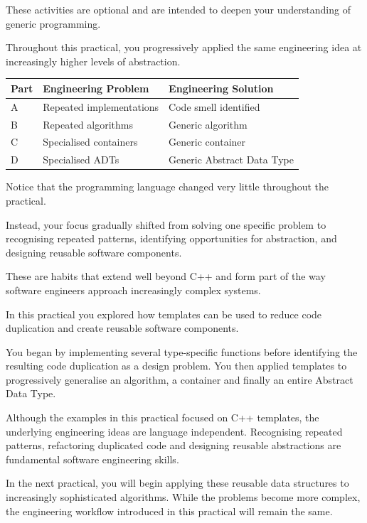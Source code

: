 \documentclass{csc2059practical}
\begin{document}
These activities are optional and are intended to deepen your understanding of generic programming.


Throughout this practical, you progressively applied the same engineering idea at increasingly higher levels of abstraction.

\begin{center}
\begin{tabular}{lll}
\toprule
\textbf{Part} & \textbf{Engineering Problem} & \textbf{Engineering Solution} \\
\midrule
A & Repeated implementations & Code smell identified \\
B & Repeated algorithms & Generic algorithm \\
C & Specialised containers & Generic container \\
D & Specialised ADTs & Generic Abstract Data Type \\
\bottomrule
\end{tabular}
\end{center}

Notice that the programming language changed very little throughout the practical.

Instead, your focus gradually shifted from solving one specific problem to recognising repeated patterns, identifying opportunities for abstraction, and designing reusable software components.

These are habits that extend well beyond C++ and form part of the way software engineers approach increasingly complex systems.


In this practical you explored how templates can be used to reduce code duplication and create reusable software components.

You began by implementing several type-specific functions before identifying the resulting code duplication as a design problem. You then applied templates to progressively generalise an algorithm, a container and finally an entire Abstract Data Type.

Although the examples in this practical focused on C++ templates, the underlying engineering ideas are language independent. Recognising repeated patterns, refactoring duplicated code and designing reusable abstractions are fundamental software engineering skills.

In the next practical, you will begin applying these reusable data structures to increasingly sophisticated algorithms. While the problems become more complex, the engineering workflow introduced in this practical will remain the same.
\end{document}
